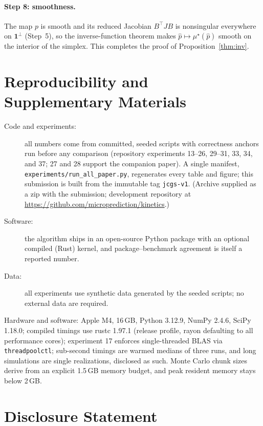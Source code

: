 \documentclass[12pt]{article}
\theoremstyle{remark}
\begin{document}
\paragraph{Step 8: smoothness.} The map $p$ is smooth and its reduced
Jacobian $B^\top J B$ is nonsingular everywhere on $\mathbf{1}^\perp$
(Step~5), so the inverse-function theorem makes $\hat p\mapsto
\mu^\star(\hat p)$ smooth on the interior of the simplex. This completes
the proof of Proposition~\ref{thm:inv}.

\section*{Reproducibility and Supplementary Materials}
\sloppy

\begin{description}
\item[Code and experiments:] all numbers come from committed, seeded
scripts with correctness anchors run before any comparison (repository
experiments 13--26, 29--31, 33, 34, and 37; 27 and 28 support the companion paper).
A single manifest,
\texttt{experiments/run\_all\_paper.py}, regenerates every table and
figure; this submission is built from the immutable tag
\texttt{jcgs-v1}. (Archive supplied as a zip with
the submission; development repository at
\url{https://github.com/microprediction/kinetics}.)
\item[Software:] the algorithm ships in an open-source Python package
with an optional compiled (Rust) kernel, and package--benchmark agreement
is itself a reported number.
\item[Data:] all experiments use synthetic data generated by the seeded
scripts; no external data are required.
\end{description}

Hardware and software: Apple M4, 16\,GB, Python 3.12.9,
NumPy 2.4.6, SciPy 1.18.0; compiled timings use rustc 1.97.1
(release profile, rayon defaulting to all performance cores); experiment 17 enforces single-threaded BLAS via
\texttt{threadpoolctl}; sub-second timings are warmed medians of three
runs, and long simulations are single realizations, disclosed as such.
Monte Carlo chunk sizes derive from an explicit 1.5\,GB memory budget, and
peak resident memory stays below 2\,GB.

\section*{Disclosure Statement}
\end{document}

